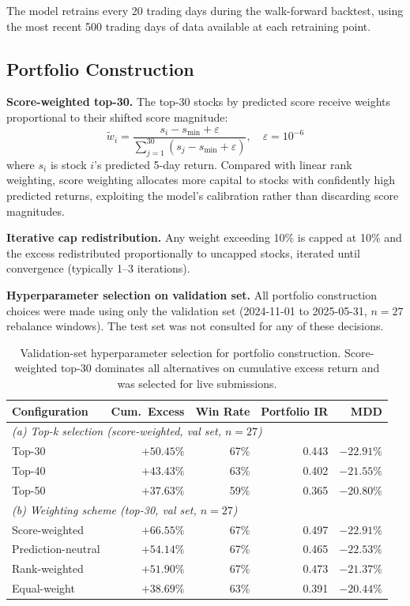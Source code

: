 \documentclass[11pt,a4paper]{article}
\begin{document}
The model retrains every 20 trading days during the walk-forward backtest,
using the most recent 500 trading days of data available at each retraining
point.

\subsection{Portfolio Construction}

\textbf{Score-weighted top-30.} The top-30 stocks by predicted score receive
weights proportional to their shifted score magnitude:
\[
  \tilde{w}_i = \frac{s_i - s_{\min} + \varepsilon}{\sum_{j=1}^{30}(s_j - s_{\min} + \varepsilon)},
  \quad \varepsilon = 10^{-6}
\]
where $s_i$ is stock $i$'s predicted 5-day return. Compared with linear
rank weighting, score weighting allocates more capital to stocks with
confidently high predicted returns, exploiting the model's calibration
rather than discarding score magnitudes.

\textbf{Iterative cap redistribution.} Any weight exceeding 10\% is capped
at 10\% and the excess redistributed proportionally to uncapped stocks,
iterated until convergence (typically 1--3 iterations).

\textbf{Hyperparameter selection on validation set.}
All portfolio construction choices were made using only the validation set
(2024-11-01 to 2025-05-31, $n=27$ rebalance windows).
The test set was not consulted for any of these decisions.

\begin{table}[h]
\centering
\begin{tabular}{lrrrr}
\toprule
Configuration & Cum.\ Excess & Win Rate & Portfolio IR & MDD \\
\midrule
\multicolumn{5}{l}{\textit{(a) Top-k selection (score-weighted, val set, $n=27$)}} \\
Top-30 & $+50.45\%$ & 67\% & 0.443 & $-22.91\%$ \\
Top-40 & $+43.43\%$ & 63\% & 0.402 & $-21.55\%$ \\
Top-50 & $+37.63\%$ & 59\% & 0.365 & $-20.80\%$ \\
\midrule
\multicolumn{5}{l}{\textit{(b) Weighting scheme (top-30, val set, $n=27$)}} \\
Score-weighted       & $\mathbf{+66.55\%}$ & 67\% & 0.497 & $-22.91\%$ \\
Prediction-neutral   & $+54.14\%$          & 67\% & 0.465 & $-22.53\%$ \\
Rank-weighted        & $+51.90\%$          & 67\% & 0.473 & $-21.37\%$ \\
Equal-weight         & $+38.69\%$          & 63\% & 0.391 & $-20.44\%$ \\
\bottomrule
\end{tabular}
\caption{Validation-set hyperparameter selection for portfolio construction.
Score-weighted top-30 dominates all alternatives on cumulative excess return
and was selected for live submissions.}
\end{table}
\end{document}
